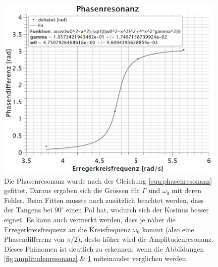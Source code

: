 \newpage
\begin{figure}[h]
\centering
\includegraphics[scale=1.1]{Bilder/phasenresonanz.png} 
\caption{Die Phasenresonanz wurde nach der Gleichung \ref{equ:phasenresonanz} gefittet. Daraus ergaben sich die Grössen für $\Gamma$ und $\omega_{0}$ mit deren Fehler. Beim Fitten musste noch zusätzlich beachtet werden, dass der Tangens bei $90^{\circ}$ einen Pol hat, wodurch sich der Kosinus besser eignet. Es kann auch vermerkt werden, dass je näher die Erregerkreisfrequenz an die Kreisfrequenz $\omega_{0}$ kommt (also eine Phasendifferenz von $\pi/2$), desto höher wird die Amplitudenresonanz. Dieses Phänomen ist deutlich zu erkennen, wenn die Abbildungen \ref{fig:amplitudenresonanz} \& \ref{fig:phasenresonanz} miteinander verglichen werden.}
\label{fig:phasenresonanz}
\end{figure}